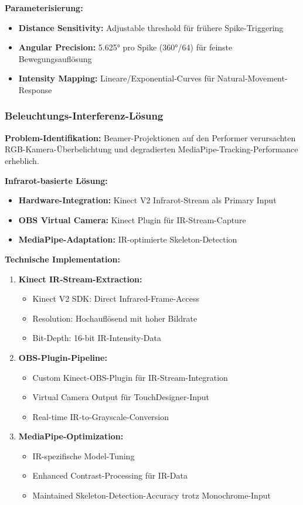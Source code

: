 \textbf{Parameterisierung:}
\begin{itemize}
    \item \textbf{Distance Sensitivity:} Adjustable threshold für frühere Spike-Triggering
    \item \textbf{Angular Precision:} 5.625° pro Spike (360°/64) für feinste Bewegungsauflösung
    \item \textbf{Intensity Mapping:} Lineare/Exponential-Curves für Natural-Movement-Response
\end{itemize}

\subsubsection{Beleuchtungs-Interferenz-Lösung}

\textbf{Problem-Identifikation:}
Beamer-Projektionen auf den Performer verursachten RGB-Kamera-Überbelichtung und degradierten MediaPipe-Tracking-Performance erheblich.

\textbf{Infrarot-basierte Lösung:}
\begin{itemize}
    \item \textbf{Hardware-Integration:} Kinect V2 Infrarot-Stream als Primary Input
    \item \textbf{OBS Virtual Camera:} Kinect Plugin für IR-Stream-Capture
    \item \textbf{MediaPipe-Adaptation:} IR-optimierte Skeleton-Detection
\end{itemize}

\textbf{Technische Implementation:}
\begin{enumerate}
    \item \textbf{Kinect IR-Stream-Extraction:}
    \begin{itemize}
        \item Kinect V2 SDK: Direct Infrared-Frame-Access
        \item Resolution: Hochauflösend mit hoher Bildrate
        \item Bit-Depth: 16-bit IR-Intensity-Data
    \end{itemize}
    
    \item \textbf{OBS-Plugin-Pipeline:}
    \begin{itemize}
        \item Custom Kinect-OBS-Plugin für IR-Stream-Integration
        \item Virtual Camera Output für TouchDesigner-Input
        \item Real-time IR-to-Grayscale-Conversion
    \end{itemize}
    
    \item \textbf{MediaPipe-Optimization:}
    \begin{itemize}
        \item IR-spezifische Model-Tuning
        \item Enhanced Contrast-Processing für IR-Data
        \item Maintained Skeleton-Detection-Accuracy trotz Monochrome-Input
    \end{itemize}
\end{enumerate}

